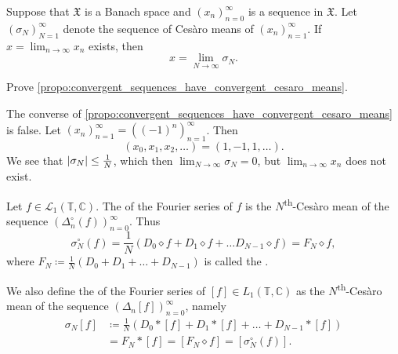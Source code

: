 \documentclass[notoc,notitlepage]{tufte-book}
\begin{document}
\begin{propo}\label{propo:convergent_sequences_have_convergent_cesaro_means}
  Suppose that $\mathfrak{X}$ is a Banach space and
  $(x_n)_{n=0}^{\infty}$ is a sequence in $\mathfrak{X}$.
  Let $(\sigma_N)_{N=1}^{\infty}$ denote the sequence of Cesàro means of
  $(x_n)_{n=1}^{\infty}$.
  If $x = \lim_{n \to \infty} x_n$ exists, then
  \begin{equation*}
    x = \lim_{N \to \infty} \sigma_N.
  \end{equation*}
\end{propo}

\begin{ex}
  Prove \cref{propo:convergent_sequences_have_convergent_cesaro_means}.
\end{ex}

\begin{remark}
  The converse of \cref{propo:convergent_sequences_have_convergent_cesaro_means}
  is false.
  Let $(x_n)_{n=1}^{\infty} = ( (-1)^n )_{n=1}^{\infty}$. Then
  \begin{equation*}
    (x_0, x_1, x_2, \ldots) = (1, -1, 1, \ldots).
  \end{equation*}
  We see that $\left|\sigma_N\right| \leq \frac{1}{N}$, which then
  $\lim_{N \to \infty} \sigma_N = 0$,
  but $\lim_{n \to \infty} x_n$ does not exist.
\end{remark}

\begin{defn}\label{defn:_n_textsuperscript_th_cesaro_sum}
  Let $f \in \mathcal{L}_1(\mathbb{T}, \mathbb{C})$.
  The  of the Fourier series
  of $f$ is the $N$\textsuperscript{th}-Cesàro mean
  of the sequence $(\Delta_n^\circ(f))_{n=0}^{\infty}$.
  Thus
  \begin{equation*}
    \sigma_N^\circ(f)
    = \frac{1}{N} (D_0 \diamond f + D_1 \diamond f + \hdots D_{N-1} \diamond f)
    = F_N \diamond f,
  \end{equation*}
  where $F_N \coloneqq \frac{1}{N}(D_0 + D_1 + \hdots + D_{N-1})$
  is called the . 

  We also define the  of the Fourier
  series of $[f] \in L_1(\mathbb{T}, \mathbb{C})$ as the
  $N$\textsuperscript{th}-Cesàro mean of the sequence
  $(\Delta_n[f])_{n=0}^{\infty}$, namely
  \begin{align*}
    \sigma_N[f]
    &\coloneqq \frac{1}{N} (D_0 * [f] + D_1 * [f] + \hdots + D_{N-1} * [f]) \\
    &= F_N * [f] = [F_N \diamond f] = [\sigma_N^\circ(f)].
  \end{align*}
\end{defn}
\end{document}
